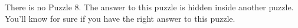 \documentclass{puzz}
\begin{document}

\begin{center}
    There is no Puzzle 8. The answer to this puzzle is hidden inside another
    puzzle. You'll know for sure if you have the right answer to this puzzle.
\end{center}
\end{document}
